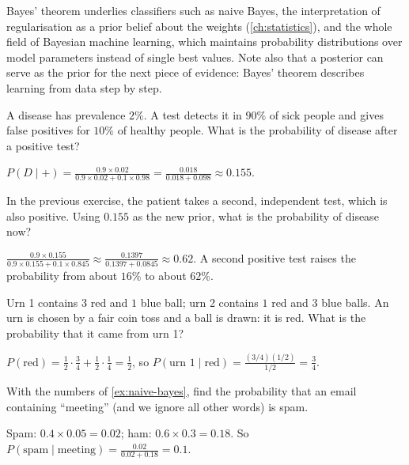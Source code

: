 \begin{mlnote}
Bayes' theorem underlies classifiers such as naive Bayes, the interpretation of
regularisation as a prior belief about the weights (\cref{ch:statistics}), and the
whole field of Bayesian machine learning, which maintains probability
distributions over model parameters instead of single best values. Note also
that a posterior can serve as the prior for the next piece of evidence: Bayes'
theorem describes learning from data step by step.
\end{mlnote}

\sectionexercises

\begin{exercise}
A disease has prevalence $2\%$. A test detects it in $90\%$ of sick people and
gives false positives for $10\%$ of healthy people. What is the probability of
disease after a positive test?
\end{exercise}
\begin{solution}
$P(D \mid +) = \tfrac{0.9\times0.02}{0.9\times0.02 + 0.1\times0.98} =
\tfrac{0.018}{0.018 + 0.098} \approx 0.155$.
\end{solution}

\begin{exercise}
In the previous exercise, the patient takes a second, independent test, which is
also positive. Using $0.155$ as the new prior, what is the probability of disease
now?
\end{exercise}
\begin{solution}
$\tfrac{0.9\times0.155}{0.9\times0.155 + 0.1\times0.845} \approx
\tfrac{0.1397}{0.1397 + 0.0845} \approx 0.62$. A second positive test raises the
probability from about $16\%$ to about $62\%$.
\end{solution}

\begin{exercise}
Urn 1 contains $3$ red and $1$ blue ball; urn 2 contains $1$ red and $3$ blue
balls. An urn is chosen by a fair coin toss and a ball is drawn: it is red. What
is the probability that it came from urn 1?
\end{exercise}
\begin{solution}
$P(\text{red}) = \tfrac12\cdot\tfrac34 + \tfrac12\cdot\tfrac14 = \tfrac12$, so
$P(\text{urn 1} \mid \text{red}) = \tfrac{(3/4)(1/2)}{1/2} = \tfrac34$.
\end{solution}

\begin{exercise}
With the numbers of \cref{ex:naive-bayes}, find the probability that an email
containing ``meeting'' (and we ignore all other words) is spam.
\end{exercise}
\begin{solution}
Spam: $0.4\times0.05 = 0.02$; ham: $0.6\times0.3 = 0.18$. So
$P(\text{spam} \mid \text{meeting}) = \tfrac{0.02}{0.02 + 0.18} = 0.1$.
\end{solution}

